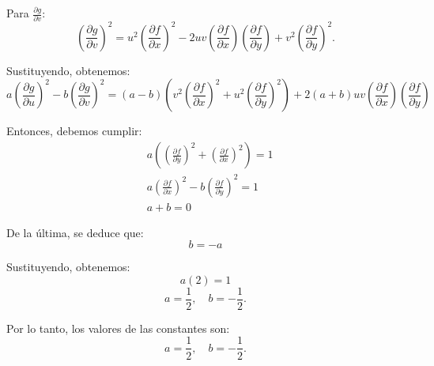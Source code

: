 \documentclass{report}
\begin{document}
    Para $\frac{\partial g}{\partial v}$:
    $$
    \left(\frac{\partial g}{\partial v}\right)^2 = u^2 \left(\frac{\partial f}{\partial x}\right)^2 - 2uv \left(\frac{\partial f}{\partial x}\right) \left(\frac{\partial f}{\partial y}\right) + v^2 \left(\frac{\partial f}{\partial y}\right)^2.
    $$

    Sustituyendo, obtenemos:
    $$
    a \left(\frac{\partial g}{\partial u}\right)^2 - b \left(\frac{\partial g}{\partial v}\right)^2 = (a - b) \left(v^2 \left(\frac{\partial f}{\partial x}\right)^2 + u^2 \left(\frac{\partial f}{\partial y}\right)^2\right) + 2(a + b) uv \left(\frac{\partial f}{\partial x}\right) \left(\frac{\partial f}{\partial y}\right)
    $$

    Entonces, debemos cumplir:
    $$
    \begin{aligned}
    & a \left( \left( \frac{\partial f}{\partial y} \right)^2 + \left( \frac{\partial f}{\partial x} \right)^2 \right) = 1 \\
    & a \left( \frac{\partial f}{\partial x} \right)^2 - b \left( \frac{\partial f}{\partial y} \right)^2 = 1 \\
    & a + b = 0
    \end{aligned}
    $$

    De la última, se deduce que:
    $$
    b = -a
    $$

    Sustituyendo, obtenemos:
    $$
    a \left( 2 \right) = 1
    $$
    $$
    a = \frac{1}{2}, \quad b = -\frac{1}{2}.
    $$

    Por lo tanto, los valores de las constantes son:
    $$
    a = \frac{1}{2}, \quad b = -\frac{1}{2}.
    $$
\end{document}
